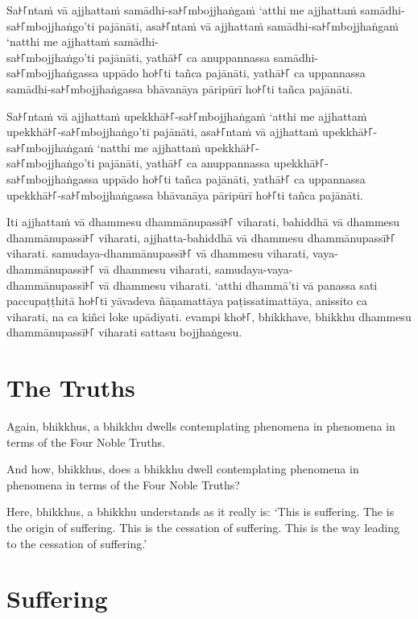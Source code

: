 Sa꜔꜒ntaṁ vā ajjhattaṁ samādhi-sa꜔꜒mbojjhaṅgaṁ ‘atthi me ajjhattaṁ samādhi-sa꜔꜒mbojjhaṅgo’ti pajānāti,
asa꜔꜒ntaṁ vā ajjhattaṁ samādhi-sa꜔꜒mbojjhaṅgaṁ ‘natthi me ajjhattaṁ samādhi-\\ sa꜔꜒mbojjhaṅgo’ti pajānāti,
yathā꜔꜒ ca anuppannassa samādhi-\\ sa꜔꜒mbojjhaṅgassa uppādo ho꜔꜒ti tañca pajānāti,
yathā꜔꜒ ca uppannassa samādhi-sa꜔꜒mbojjhaṅgassa bhāvanāya pāripūrī ho꜔꜒ti tañca pajānāti.

Sa꜔꜒ntaṁ vā ajjhattaṁ upekkhā꜔꜒-sa꜔꜒mbojjhaṅgaṁ ‘atthi me ajjhattaṁ upekkhā꜔꜒-sa꜔꜒mbojjhaṅgo’ti pajānāti,
asa꜔꜒ntaṁ vā ajjhattaṁ upekkhā꜔꜒-sa꜔꜒mbojjhaṅgaṁ ‘natthi me ajjhattaṁ upekkhā꜔꜒-\\ sa꜔꜒mbojjhaṅgo’ti pajānāti,
yathā꜔꜒ ca anuppannassa upekkhā꜔꜒-\\ sa꜔꜒mbojjhaṅgassa uppādo ho꜔꜒ti tañca pajānāti,
yathā꜔꜒ ca uppannassa upekkhā꜔꜒-sa꜔꜒mbojjhaṅgassa bhāvanāya pāripūrī ho꜔꜒ti tañca pajānāti.

Iti ajjhattaṁ vā dhammesu dhammānupassī꜔꜒ viharati,
bahiddhā vā dhammesu dhammānupassī꜔꜒ viharati,
ajjhatta-bahiddhā vā dhammesu dhammānupassī꜔꜒ viharati.
samudaya-dhammānupassī꜔꜒ vā dhammesu viharati,
vaya-dhammānupassī꜔꜒ vā dhammesu viharati,
samudaya-vaya-\\ dhammānupassī꜔꜒ vā dhammesu viharati.
‘atthi dhammā’ti vā panassa sati paccupaṭṭhitā ho꜔꜒ti
yāvadeva ñāṇamattāya paṭissatimattāya, anissito ca viharati,
na ca kiñci loke upādiyati. evampi kho꜔꜒, bhikkhave, bhikkhu
dhammesu dhammānupassī꜔꜒ viharati sattasu bojjhaṅgesu.

\enlargethispage{\baselineskip}


\englishPage
\section*{The Truths}%

Again, bhikkhus, a bhikkhu dwells contemplating phenomena in phenomena in terms
of the Four Noble Truths.

And how, bhikkhus, does a bhikkhu dwell contemplating phenomena in phenomena in
terms of the Four Noble Truths?

Here, bhikkhus, a bhikkhu understands as it really is: `This is suffering. The
is the origin of suffering. This is the cessation of suffering. This is the way
leading to the cessation of suffering.'

\section{Suffering}

